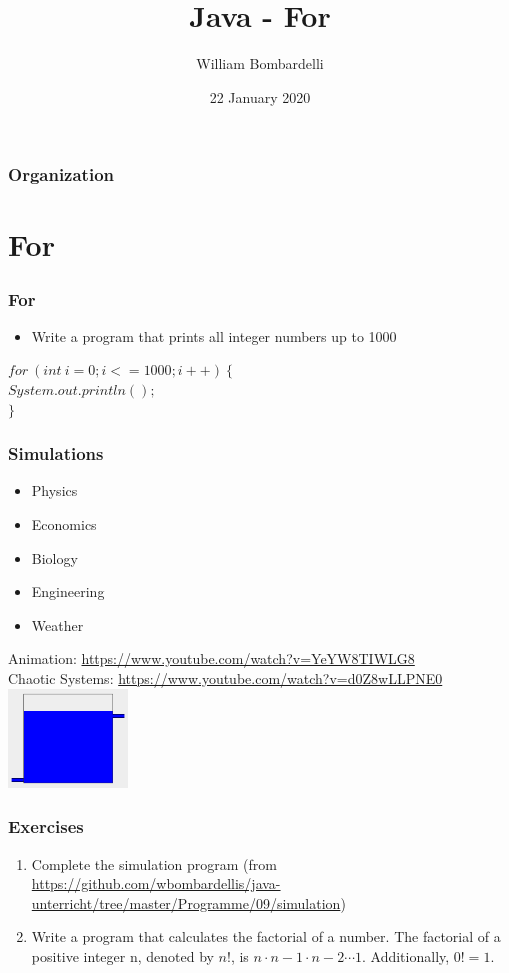 \documentclass{beamer}
\title[Java]{Java - For}
\author[W. Bombardelli]{William Bombardelli}
\institute[Schweizerschule Mexiko]
{
	\vskip 12pt
	Schweizerschule Mexiko, Ciudad de México, Mexico \\
	\texttt{\url{https://github.com/wbombardellis/java-unterricht}}
}
\date{22 January 2020}
\newcommand{\cindent}{\hskip20pt}
\begin{document}
	\begin{frame}
		\titlepage
	\end{frame}
	
	\begin{frame}
		\frametitle{Organization}
		\tableofcontents
	\end{frame}

	\section{For}
	\begin{frame}
		\frametitle{For}
		\begin{itemize}
			\item Write a program that prints all integer numbers up to 1000
		\end{itemize}
		\pause
		$for\ (int\ i = 0; i <= 1000; i++)\ \{$\\
			\cindent $System.out.println();$\\
		$\}$\\
	\end{frame}

	\begin{frame}
		\frametitle{Simulations}
		\begin{itemize}
			\item Physics
			\item Economics
			\item Biology
			\item Engineering
			\item Weather
		\end{itemize}
		\pause
		Animation: \url{https://www.youtube.com/watch?v=YeYW8TIWLG8}\\
		Chaotic Systems: \url{https://www.youtube.com/watch?v=d0Z8wLLPNE0}\\
		\pause
		\centering
		\includegraphics[width=90pt]{tank.png}
	\end{frame}

	\begin{frame}
		\frametitle{Exercises}
		\begin{enumerate}
			\item Complete the simulation program (from \url{https://github.com/wbombardellis/java-unterricht/tree/master/Programme/09/simulation})
			\pause
			\item Write a program that calculates the factorial of a number. The factorial of a positive integer n, denoted by $n!$, is $n \cdot n-1 \cdot n-2 \cdots 1$. Additionally, $0! = 1$.
		\end{enumerate}
	\end{frame}
\end{document}
